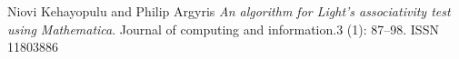 \begin{thebibliography}{1}


Niovi Kehayopulu and Philip Argyris \emph{An algorithm for Light's
associativity test using Mathematica}. Journal of computing and information.3
(1): 87–98. ISSN 11803886

\end{thebibliography}
